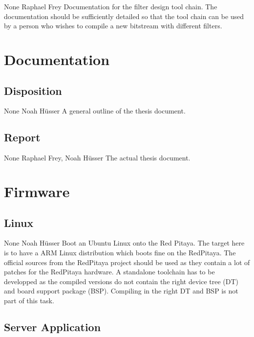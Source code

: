 \documentclass[a4paper,oneside]{alpenspecs/alpenspecs}
\begin{document}
\wpac
     {}
     {}
     {}
     {None}
     {}
     {Raphael Frey}
     {%
         Documentation  for the  filter design  tool chain. The  documentation
         should be sufficiently detailed so that the tool chain can be used by
         a  person  who wishes  to  compile  a  new bitstream  with  different
         filters.
     }


\section{Documentation}
\label{sec:docs}

\subsection{Disposition}
\wpac
     {}
     {}
     {}
     {None}
     {}
     {Noah H\"usser}
     {%
        A general outline of the thesis document.%
     }

\subsection{Report}
\wpac
     {}
     {}
     {}
     {None}
     {}
     {Raphael Frey, Noah H\"usser}
     {%
        The actual thesis document.%
     }


\section{Firmware}
\label{sec:firmware}

\subsection{Linux}
\label{subsec:fw:linux}

\wpac
     {}
     {}
     {}
     {None}
     {}
     {Noah H\"usser}
     {%
        Boot an Ubuntu Linux onto the Red Pitaya.%
        The target here is to have a ARM Linux distribution which boots fine on the RedPitaya.
        The official sources from the RedPitaya project should be used as they contain a lot of patches for the RedPitaya hardware.
        A standalone toolchain has to be developped as the compiled versions do not contain the right device tree (DT) and board support package (BSP).
        Compiling in the right DT and BSP is not part of this task.
     }

\subsection{Server Application}
\label{subsec:fw:server}
\end{document}

